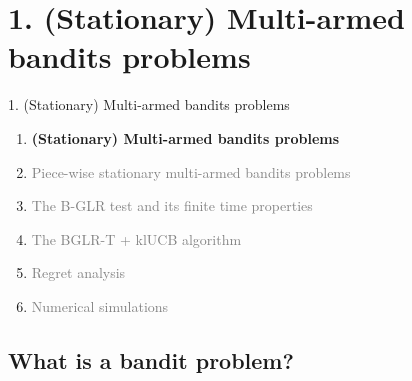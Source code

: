 \documentclass[11pt,english,ignorenonframetext,]{beamer}
\begin{document}
\section{\hfill{}1. (Stationary) Multi-armed bandits problems\hfill{}}

\begin{frame}{1. (Stationary) Multi-armed bandits problems}

  \begin{enumerate}
    \item
    \alert{\textbf{%
      (Stationary) Multi-armed bandits problems
    }}
    \vspace*{15pt}

    \item
    \textcolor{gray}{
      Piece-wise stationary multi-armed bandits problems
    }
    \vspace*{15pt}

    \item
    \textcolor{gray}{
      The B-GLR test and its finite time properties
    }
    \vspace*{15pt}

    \item
    \textcolor{gray}{
      The BGLR-T + klUCB algorithm
    }
    \vspace*{15pt}

    \item
    \textcolor{gray}{
      Regret analysis
    }
    \vspace*{15pt}

    \item
    \textcolor{gray}{
      Numerical simulations
    }
  \end{enumerate}

\end{frame}

\subsection{\hfill{}What is a bandit problem?\hfill{}}
\end{document}

